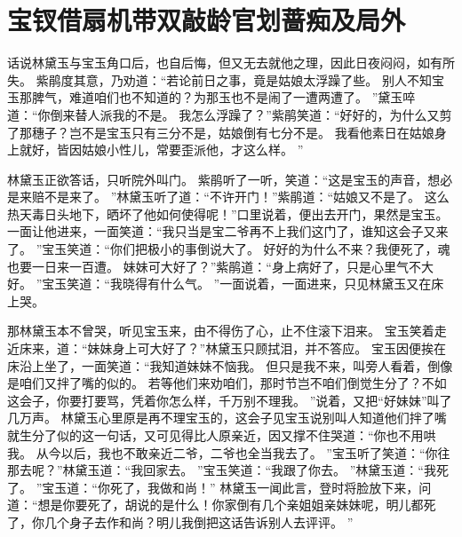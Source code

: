 \chapter{宝钗借扇机带双敲\quad 龄官划蔷痴及局外}
\par
{}\par
话说林黛玉与宝玉角口后，也自后悔，但又无去就他之理，因此日夜闷闷，如有所失。
紫鹃度其意，乃劝道：“若论前日之事，竟是姑娘太浮躁了些。
别人不知宝玉那脾气，难道咱们也不知道的？为那玉也不是闹了一遭两遭了。
”黛玉啐道：“你倒来替人派我的不是。
我怎么浮躁了？”紫鹃笑道：“好好的，为什么又剪了那穗子？岂不是宝玉只有三分不是，姑娘倒有七分不是。
我看他素日在姑娘身上就好，皆因姑娘小性儿，常要歪派他，才这么样。
”\par
林黛玉正欲答话，只听院外叫门。
紫鹃听了一听，笑道：“这是宝玉的声音，想必是来赔不是来了。
”林黛玉听了道：“不许开门！”紫鹃道：“姑娘又不是了。
这么热天毒日头地下，晒坏了他如何使得呢！”口里说着，便出去开门，果然是宝玉。
一面让他进来，一面笑道：“我只当是宝二爷再不上我们这门了，谁知这会子又来了。
”宝玉笑道：“你们把极小的事倒说大了。
好好的为什么不来？我便死了，魂也要一日来一百遭。
妹妹可大好了？”紫鹃道：“身上病好了，只是心里气不大好。
”宝玉笑道：“我晓得有什么气。
”一面说着，一面进来，只见林黛玉又在床上哭。
\par
那林黛玉本不曾哭，听见宝玉来，由不得伤了心，止不住滚下泪来。
宝玉笑着走近床来，道：“妹妹身上可大好了？”林黛玉只顾拭泪，并不答应。
宝玉因便挨在床沿上坐了，一面笑道：“我知道妹妹不恼我。
但只是我不来，叫旁人看着，倒像是咱们又拌了嘴的似的。
若等他们来劝咱们，那时节岂不咱们倒觉生分了？不如这会子，你要打要骂，凭着你怎么样，千万别不理我。
”说着，又把“好妹妹”叫了几万声。
林黛玉心里原是再不理宝玉的，这会子见宝玉说别叫人知道他们拌了嘴就生分了似的这一句话，又可见得比人原亲近，因又撑不住哭道：“你也不用哄我。
从今以后，我也不敢亲近二爷，二爷也全当我去了。
”宝玉听了笑道：“你往那去呢？”林黛玉道：“我回家去。
”宝玉笑道：“我跟了你去。
”林黛玉道：“我死了。
”宝玉道：“你死了，我做和尚！”
林黛玉一闻此言，登时将脸放下来，问道：“想是你要死了，胡说的是什么！你家倒有几个亲姐姐亲妹妹呢，明儿都死了，你几个身子去作和尚？明儿我倒把这话告诉别人去评评。
”\par
